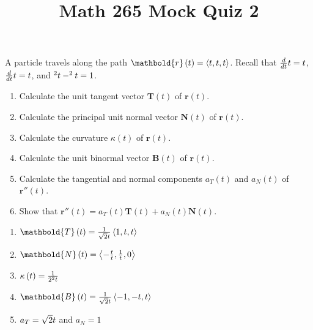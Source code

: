 \documentclass[12pt]{article}
\title{Math 265 Mock Quiz 2}\author{}\date{}
\let\cosh\relax\DeclareMathOperator{\cosh}{\mathsf{cosh}}
\let\sinh\relax\DeclareMathOperator{\sinh}{\mathsf{sinh}}
\begin{document}
\maketitle
\thispagestyle{empty}
A particle travels along the path
$\mathbold{r}\left(t\right)=\left\langle
t,\cosh{t},\sinh{t}\right\rangle$.
Recall that $\frac{d}{dt}\cosh{t}=\sinh{t}$,
$\frac{d}{dt}\sinh{t}=\cosh{t}$,
and $\cosh^2{t}-\sinh^2{t}=1$.
\begin{enumerate}
\item Calculate the unit tangent vector
$\mathbold{T}\left(t\right)$ of $\mathbold{r}\left(t\right)$.
\vspace{2in}
\item Calculate the principal unit normal vector
$\mathbold{N}\left(t\right)$ of $\mathbold{r}\left(t\right)$.
\vspace{2in}
\item Calculate the curvature $\kappa\left(t\right)$
of $\mathbold{r}\left(t\right)$.
\vspace{2in}
\item Calculate the unit binormal vector
$\mathbold{B}\left(t\right)$ of $\mathbold{r}\left(t\right)$.
\vspace{2in}
\item Calculate 
the tangential and normal components 
$a_T\left(t\right)$ and $a_N\left(t\right)$ of $\mathbold{r}''\left(t\right)$.
\vspace{2in}
\item Show that
$\mathbold{r}''\left(t\right)=a_T\left(t\right)\mathbold{T}\left(t\right)
+a_N\left(t\right)\mathbold{N}\left(t\right)$.
\vspace{2in}
\end{enumerate}

\begin{enumerate}
\item $\mathbold{T}\left(t\right)=
\frac{1}{\sqrt{2}\cosh{t}}\left\langle 1,\sinh{t},\cosh{t}
\right\rangle$
\item $\mathbold{N}\left(t\right)=\left\langle
-\frac{\sinh{t}}{\cosh{t}},\frac{1}{\cosh{t}},0
\right\rangle$
\item $\kappa\left(t\right)=\frac{1}{2\cosh^2{t}}$
\item $\mathbold{B}\left(t\right)=\frac{1}{\sqrt{2}\cosh{t}}
\left\langle -1,-\sinh{t},\cosh{t}\right\rangle$
\item $a_T=\sqrt{2}\sinh{t}$ and $a_N=1$
\end{enumerate}
\end{document}
